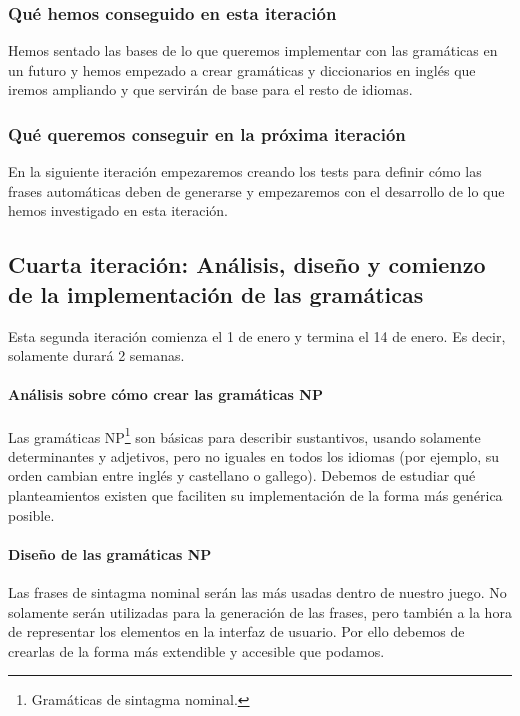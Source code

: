 \subsubsection{Qué hemos conseguido en esta iteración}

Hemos sentado las bases de lo que queremos implementar con las gramáticas en un futuro y hemos empezado a crear gramáticas y diccionarios en inglés que iremos ampliando y que servirán de base para el resto de idiomas.

\subsubsection{Qué queremos conseguir en la próxima iteración}

En la siguiente iteración empezaremos creando los tests para definir cómo las frases automáticas deben de generarse y empezaremos con el desarrollo de lo que hemos investigado en esta iteración.

\subsection{Cuarta iteración: Análisis, diseño y comienzo de la implementación de las gramáticas}

Esta segunda iteración comienza el 1 de enero y termina el 14 de enero. Es decir, solamente durará 2 semanas.

\paragraph{Análisis sobre cómo crear las gramáticas NP} Las gramáticas NP\footnote{Gramáticas de sintagma nominal.} son básicas para describir sustantivos, usando solamente determinantes y adjetivos, pero no iguales en todos los idiomas (por ejemplo, su orden cambian entre inglés y castellano o gallego). Debemos de estudiar qué planteamientos existen que faciliten su implementación de la forma más genérica posible.

\paragraph{Diseño de las gramáticas NP} Las frases de sintagma nominal serán las más usadas dentro de nuestro juego. No solamente serán utilizadas para la generación de las frases, pero también a la hora de representar los elementos en la interfaz de usuario. Por ello debemos de crearlas de la forma más extendible y accesible que podamos.


